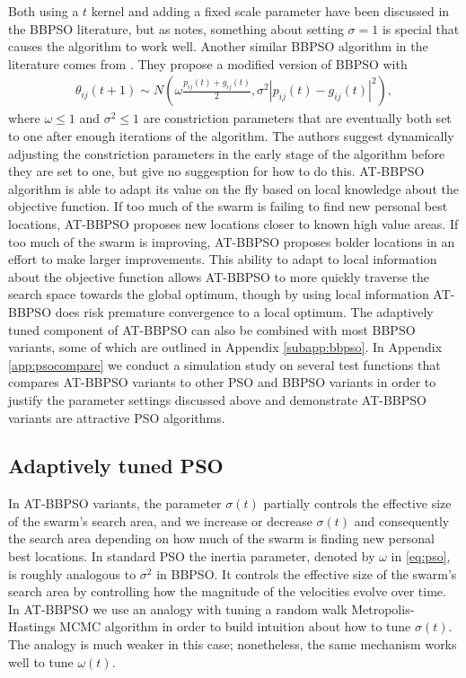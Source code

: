 \documentclass[12pt]{article}
\begin{document}
Both using a $t$ kernel and adding a fixed scale parameter have been discussed in the BBPSO literature, but as \citet{kennedy2003bare} notes, something about setting $\sigma=1$ is special that causes the algorithm to work well. Another similar BBPSO algorithm in the literature comes from \citet{hsieh2010modified}. They propose a modified version of BBPSO with 
\begin{align*}
\theta_{ij}(t+1) \sim N\left(\omega\frac{p_{ij}(t) + g_{ij}(t)}{2}, \sigma^2|p_{ij}(t) - g_{ij}(t)|^2\right),
\end{align*}
where $\omega\leq 1$ and $\sigma^2\leq 1$ are constriction parameters that are eventually both set to one after enough iterations of the algorithm. The authors suggest dynamically adjusting the constriction parameters in the early stage of the algorithm before they are set to one, but give no suggesption for how to do this. AT-BBPSO algorithm is able to adapt its value on the fly based on local knowledge about the objective function. If too much of the swarm is failing to find new personal best locations, AT-BBPSO proposes new locations closer to known high value areas. If too much of the swarm is improving, AT-BBPSO proposes bolder locations in an effort to make larger improvements. This ability to adapt to local information about the objective function allows AT-BBPSO to more quickly traverse the search space towards the global optimum, though by using local information AT-BBPSO does risk premature convergence to a local optimum. The adaptively tuned component of AT-BBPSO can also be combined with most BBPSO variants, some of which are outlined in Appendix \ref{subapp:bbpso}. In Appendix \ref{app:psocompare} we conduct a simulation study on several test functions that compares AT-BBPSO variants to other PSO and BBPSO variants in order to justify the parameter settings discussed above and demonstrate AT-BBPSO variants are attractive PSO algorithms.

\subsection{Adaptively tuned PSO}\label{sec:AT-PSO}
In AT-BBPSO variants, the parameter $\sigma(t)$ partially controls the effective size of the swarm's search area, and we increase or decrease $\sigma(t)$ and consequently the search area depending on how much of the swarm is finding new personal best locations. In standard PSO the inertia parameter, denoted by $\omega$ in \eqref{eq:pso}, is roughly analogous to $\sigma^2$ in BBPSO. It controls the effective size of the swarm's search area by controlling how the magnitude of the velocities evolve over time. In AT-BBPSO we use an analogy with tuning a random walk Metropolis-Hastings MCMC algorithm in order to build intuition about how to tune $\sigma(t)$. The analogy is much weaker in this case; nonetheless, the same mechanism works well to tune $\omega(t)$.
\end{document}
